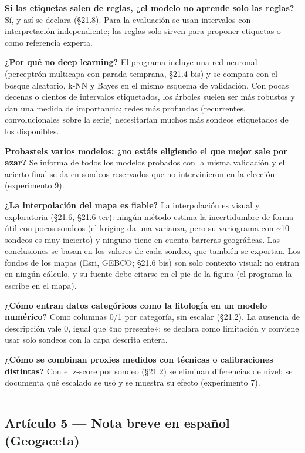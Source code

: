 \documentclass[
  10pt,
]{article}
\begin{document}
\textbf{Si las etiquetas salen de reglas, ¿el modelo no aprende solo las
reglas?} Sí, y así se declara (§21.8). Para la evaluación se usan
intervalos con interpretación independiente; las reglas solo sirven para
proponer etiquetas o como referencia experta.

\textbf{¿Por qué no deep learning?} El programa incluye una red neuronal
(perceptrón multicapa con parada temprana, §21.4 bis) y se compara con
el bosque aleatorio, k-NN y Bayes en el mismo esquema de validación. Con
pocas decenas o cientos de intervalos etiquetados, los árboles suelen
ser más robustos y dan una medida de importancia; redes más profundas
(recurrentes, convolucionales sobre la serie) necesitarían muchos más
sondeos etiquetados de los disponibles.

\textbf{Probasteis varios modelos: ¿no estáis eligiendo el que mejor
sale por azar?} Se informa de todos los modelos probados con la misma
validación y el acierto final se da en sondeos reservados que no
intervinieron en la elección (experimento 9).

\textbf{¿La interpolación del mapa es fiable?} La interpolación es
visual y exploratoria (§21.6, §21.6 ter): ningún método estima la
incertidumbre de forma útil con pocos sondeos (el kriging da una
varianza, pero su variograma con \textasciitilde10 sondeos es muy
incierto) y ninguno tiene en cuenta barreras geográficas. Las
conclusiones se basan en los valores de cada sondeo, que también se
exportan. Los fondos de los mapas (Esri, GEBCO; §21.6 bis) son solo
contexto visual: no entran en ningún cálculo, y su fuente debe citarse
en el pie de la figura (el programa la escribe en el mapa).

\textbf{¿Cómo entran datos categóricos como la litología en un modelo
numérico?} Como columnas 0/1 por categoría, sin escalar (§21.2). La
ausencia de descripción vale 0, igual que «no presente»; se declara como
limitación y conviene usar solo sondeos con la capa descrita entera.

\textbf{¿Cómo se combinan proxies medidos con técnicas o calibraciones
distintas?} Con el z-score por sondeo (§21.2) se eliminan diferencias de
nivel; se documenta qué escalado se usó y se muestra su efecto
(experimento 7).

\begin{center}\rule{0.5\linewidth}{0.5pt}\end{center}

\hypertarget{artuxedculo-5-nota-breve-en-espauxf1ol-geogaceta}{%
\subsection{Artículo 5 --- Nota breve en español
(Geogaceta)}\label{artuxedculo-5-nota-breve-en-espauxf1ol-geogaceta}}
\end{document}
